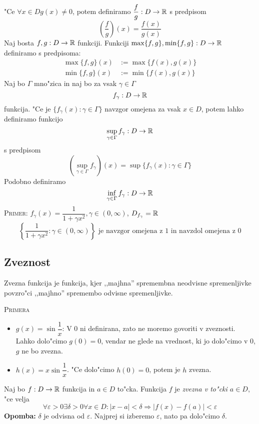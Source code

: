 "Ce $\forall x \in D g(x) \neq 0$, potem definiramo $\dfrac{f}{g}: D \to \mathbb{R}$ s predpisom
\begin{equation*}
\left(\dfrac{f}{g}\right)(x) = \dfrac{f(x)}{g(x)}
\end{equation*}
 Naj bosta $f, g : D \to \mathbb{R}$ funkciji. Funkciji $\max \{f, g\}, \min \{f, g\}: D \to \mathbb{R}$ definiramo s predpisoma:
\begin{align*}
\max \{f, g\}(x) &:= \max\{f(x), g(x)\}\\
\min \{f, g\}(x) &:= \min\{f(x), g(x)\}
\end{align*}
 Naj bo $\Gamma$ mno"zica in naj bo za vsak $\gamma \in \Gamma$
\begin{equation*}
f_\gamma: D \to \mathbb{R}
\end{equation*}
funkcija. "Ce je $\{f_\gamma(x): \gamma \in \Gamma\}$ navzgor omejena za vsak $x \in D$, potem lahko definiramo funkcijo
\begin{equation*}
\sup_{\gamma \in \Gamma}f_\gamma: D \to \mathbb{R}
\end{equation*}
s predpisom
\begin{equation*}
(\sup_{\gamma \in \Gamma} f_\gamma)(x) = \sup \{f_\gamma(x): \gamma \in \Gamma\}
\end{equation*}
Podobno definiramo 
\begin{equation*}
\inf_{\gamma \in \Gamma}f_\gamma: D \to \mathbb{R}
\end{equation*}
\textsc{Primer:} $f_\gamma(x) = \dfrac{1}{1 + \gamma x^2}, \gamma \in (0, \infty)$, $D_{f_\gamma} = \mathbb{R}$
\begin{equation*}
\left\{\dfrac{1}{1 + \gamma x^2}: \gamma \in (0, \infty)\right\} \text{ je navzgor omejena z 1 in navzdol omejena z 0}
\end{equation*}
%
\subsection{Zveznost}
Zvezna funkcija je funkcija, kjer ,,majhna'' spremembna neodvisne spremenljivke povzro"ci ,,majhno'' spremembo odvisne spremenljivke.

\textsc{Primera}
\begin{itemize}
	\item $g(x) = \sin \dfrac{1}{x}$: V 0 ni definirana, zato ne moremo govoriti v zveznosti. Lahko dolo"cimo $g(0) = 0$, vendar ne glede na vrednost, ki jo dolo"cimo v 0, $g$ ne bo zvezna.
	
	\item $h(x) = x \sin \dfrac{1}{x}$. "Ce dolo"cimo $h(0) = 0$, potem je $h$ zvezna.
\end{itemize}
 Naj bo $f: D \to \mathbb{R}$ funkcija in $a \in D$ to"cka. Funkcija $f$ je \emph{zvezna v to"cki $a \in D$}, "ce velja
\begin{equation*}
\forall \varepsilon > 0 \exists \delta > 0 \forall x \in D: |x - a| < \delta \Rightarrow |f(x)-f(a)| < \varepsilon
\end{equation*}
\textbf{Opomba:} $\delta$ je odvisna od $\varepsilon$. Najprej si izberemo $\varepsilon$, nato pa dolo"cimo $\delta$.

